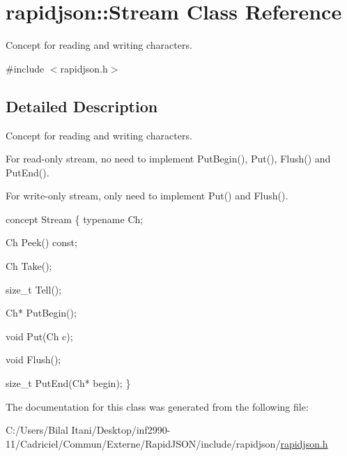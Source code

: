 \hypertarget{classrapidjson_1_1_stream}{}\section{rapidjson\+:\+:Stream Class Reference}
\label{classrapidjson_1_1_stream}


Concept for reading and writing characters.  




{\ttfamily \#include $<$rapidjson.\+h$>$}



\subsection{Detailed Description}
Concept for reading and writing characters. 

For read-\/only stream, no need to implement Put\+Begin(), Put(), Flush() and Put\+End().

For write-\/only stream, only need to implement Put() and Flush().


\begin{DoxyCode}
concept Stream \{
    \textcolor{keyword}{typename} Ch;    

    Ch Peek() \textcolor{keyword}{const};

    Ch Take();

    \textcolor{keywordtype}{size\_t} Tell();

    Ch* PutBegin();

    \textcolor{keywordtype}{void} Put(Ch c);

    \textcolor{keywordtype}{void} Flush();

    \textcolor{keywordtype}{size\_t} PutEnd(Ch* begin);
\}
\end{DoxyCode}
 

The documentation for this class was generated from the following file\+:\begin{DoxyCompactItemize}
\item 
C\+:/\+Users/\+Bilal Itani/\+Desktop/inf2990-\/11/\+Cadriciel/\+Commun/\+Externe/\+Rapid\+J\+S\+O\+N/include/rapidjson/\hyperlink{rapidjson_8h}{rapidjson.\+h}\end{DoxyCompactItemize}

